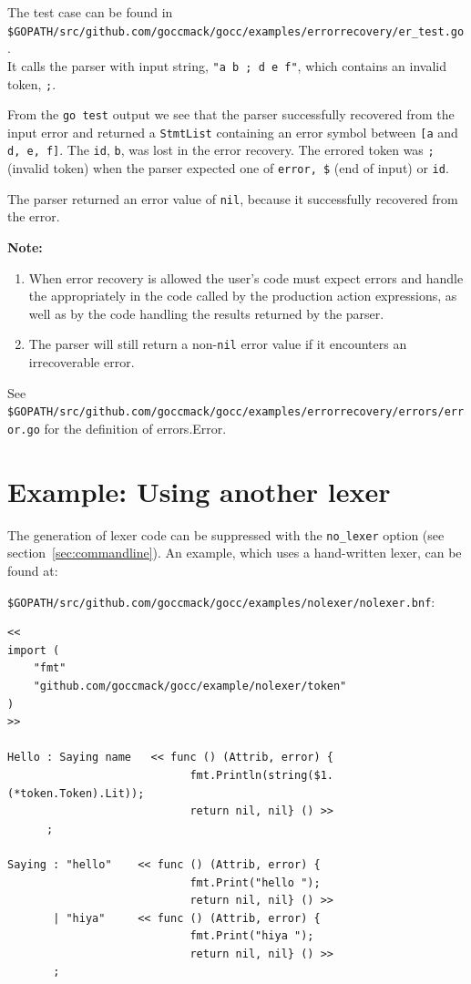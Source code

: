 \documentclass[12pt]{article}
\begin{document}
	The test case can be found in \\
	\verb|$GOPATH/src/github.com/goccmack/gocc/examples/errorrecovery/er_test.go|. \\
	It calls the parser with input string, \verb|"a b ; d e f"|, which contains an invalid token, \verb|;|.

	From the \verb|go test| output we see that the parser successfully recovered from the input error and returned a \verb|StmtList| containing an error symbol between \verb|[a| and \verb|d, e, f]|. The \verb|id|, \verb|b|, was lost in the error recovery.  The errored token was \verb|;| (invalid token) when the parser expected one of \verb|error, $| (end of input) or \verb|id|.

	The parser returned an error value of \verb|nil|, because it successfully recovered from the error.

	{\bf Note:} \\
	\begin{enumerate}
		\item When error recovery is allowed the user's code must expect errors and handle the appropriately in the code called by the production action expressions, as well as by the code handling the results returned by the parser.

		\item The parser will still return a non-\verb|nil| error value if it encounters an irrecoverable error.
	\end{enumerate}

	See \verb|$GOPATH/src/github.com/goccmack/gocc/examples/errorrecovery/errors/error.go| for the definition of errors.Error.

\section{Example: Using another lexer} \label{sec:no lexer}
	The generation of lexer code can be suppressed with the \verb|no_lexer| option (see section~\ref{sec:commandline}). An example,
	which uses a hand-written lexer, can be found at:

	\verb|$GOPATH/src/github.com/goccmack/gocc/examples/nolexer/nolexer.bnf|:

	\begin{verbatim}
<<
import (
    "fmt"
    "github.com/goccmack/gocc/example/nolexer/token"
)
>>

Hello : Saying name   << func () (Attrib, error) {
                            fmt.Println(string($1.(*token.Token).Lit));
                            return nil, nil} () >>
      ;

Saying : "hello"    << func () (Attrib, error) {
                            fmt.Print("hello ");
                            return nil, nil} () >>
       | "hiya"     << func () (Attrib, error) {
                            fmt.Print("hiya ");
                            return nil, nil} () >>
       ;
    \end{verbatim}
\end{document}
